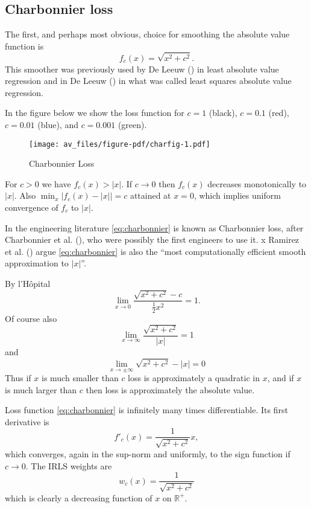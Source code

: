 \documentclass[
  12pt,
  letterpaper,
  DIV=11,
  numbers=noendperiod]{scrartcl}
\begin{document}
\subsection{Charbonnier loss}\label{charbonnier-loss}

The first, and perhaps most obvious, choice for smoothing the absolute
value function is \begin{equation}
f_c(x)=\sqrt{x^2 + c^2}.\label{eq:charbonnier}
\end{equation} This smoother was previously used by De Leeuw
() in least absolute value regression
and in De Leeuw () in what was called
least squares absolute value regression.

In the figure below we show the loss function for \(c=1\) (black),
\(c=0.1\) (red), \(c=0.01\) (blue), and \(c=0.001\) (green).

\begin{figure}[H]

{\centering \texttt{[image: av\_files/figure-pdf/charfig-1.pdf]}

}

\caption{Charbonnier Loss}

\end{figure}%

For \(c>0\) we have \(f_c(x)>|x|\). If \(c\rightarrow 0\) then
\(f_c(x)\) decreases monotonically to \(|x|\). Also
\(\min_x|f_c(x)-|x||=c\) attained at \(x=0\), which implies uniform
convergence of \(f_c\) to \(|x|\).

In the engineering literature \eqref{eq:charbonnier} is known as
Charbonnier loss, after Charbonnier et al.
(), who
were possibly the first engineers to use it. x Ramirez et al.
() argue
\eqref{eq:charbonnier} is also the ``most computationally efficient
smooth approximation to \(|x|\)''.

By l'Hôpital \[
\lim_{x\rightarrow 0}\frac{\sqrt{x^2+c^2}-c}{\frac12x^2}=1.
\] Of course also \[
\lim_{x\rightarrow\infty}\frac{\sqrt{x^2+c^2}}{|x|}=1
\] and \[
\lim_{x\rightarrow\pm\infty}\sqrt{x^2+c^2}-|x|=0
\] Thus if \(x\) is much smaller than \(c\) loss is approximately a
quadratic in \(x\), and if \(x\) is much larger than \(c\) then loss is
approximately the absolute value.

Loss function \eqref{eq:charbonnier} is infinitely many times
differentiable. Its first derivative is \[
f'_c(x)=\frac{1}{\sqrt{x^2+c^2}}x,
\] which converges, again in the sup-norm and uniformly, to the sign
function if \(c\rightarrow 0\). The IRLS weights are \[
w_c(x)=\frac{1}{\sqrt{x^2+c^2}}
\] which is clearly a decreasing function of \(x\) on \(\mathbb{R}^+\).
\end{document}
